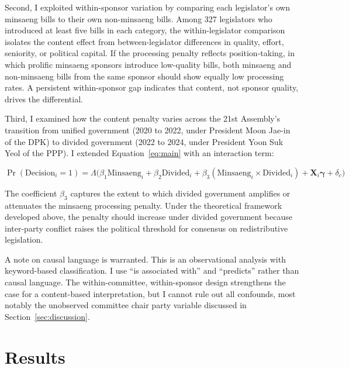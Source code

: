\documentclass[11pt]{article}
\begin{document}
Second, I exploited within-sponsor variation by comparing each legislator's own minsaeng bills to their own non-minsaeng bills. Among 327 legislators who introduced at least five bills in each category, the within-legislator comparison isolates the content effect from between-legislator differences in quality, effort, seniority, or political capital. If the processing penalty reflects position-taking, in which prolific minsaeng sponsors introduce low-quality bills, both minsaeng and non-minsaeng bills from the same sponsor should show equally low processing rates. A persistent within-sponsor gap indicates that content, not sponsor quality, drives the differential.

Third, I examined how the content penalty varies across the 21st Assembly's transition from unified government (2020 to 2022, under President Moon Jae-in of the DPK) to divided government (2022 to 2024, under President Yoon Suk Yeol of the PPP). I extended Equation~\ref{eq:main} with an interaction term:

\begin{equation}
\Pr(\text{Decision}_i = 1) = \Lambda\bigl(\beta_1 \text{Minsaeng}_i + \beta_2 \text{Divided}_i + \beta_3 (\text{Minsaeng}_i \times \text{Divided}_i) + \mathbf{X}_i \boldsymbol{\gamma} + \delta_c\bigr)
\label{eq:interaction}
\end{equation}

\noindent The coefficient $\beta_3$ captures the extent to which divided government amplifies or attenuates the minsaeng processing penalty. Under the theoretical framework developed above, the penalty should increase under divided government because inter-party conflict raises the political threshold for consensus on redistributive legislation.

A note on causal language is warranted. This is an observational analysis with keyword-based classification. I use ``is associated with'' and ``predicts'' rather than causal language. The within-committee, within-sponsor design strengthens the case for a content-based interpretation, but I cannot rule out all confounds, most notably the unobserved committee chair party variable discussed in Section~\ref{sec:discussion}.


\section{Results}
\end{document}
